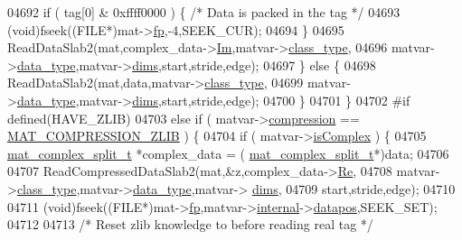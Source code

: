 \begin{DoxyCode}
{{{{{{{{{{{{{{{{{{{{{{{{{{04692                 \textcolor{keywordflow}{if} ( tag[0] & 0xffff0000 ) \{ \textcolor{comment}{/* Data is packed in the tag */}
04693                     (void)fseek((FILE*)mat->\hyperlink{struct__mat__t_a85f562e407ca9ad4d2a6e14f839432b7}{fp},-4,SEEK\_CUR);
04694                 \}
04695                 ReadDataSlab2(mat,complex\_data->\hyperlink{group___m_a_t_a7182d10b0d3598415887376065440946}{Im},matvar->\hyperlink{group___m_a_t_aff13035bf3265dd7d9425e5d40c839d4}{class\_type},
04696                               matvar->\hyperlink{group___m_a_t_ab6aafe9bd77f0f077852593dec438144}{data\_type},matvar->\hyperlink{group___m_a_t_a8e01234e1c862ce3472bb37f5a09b92c}{dims},start,stride,edge);
04697             \} \textcolor{keywordflow}{else} \{
04698                 ReadDataSlab2(mat,data,matvar->\hyperlink{group___m_a_t_aff13035bf3265dd7d9425e5d40c839d4}{class\_type},
04699                     matvar->\hyperlink{group___m_a_t_ab6aafe9bd77f0f077852593dec438144}{data\_type},matvar->\hyperlink{group___m_a_t_a8e01234e1c862ce3472bb37f5a09b92c}{dims},start,stride,edge);
04700             \}
04701         \}
04702 \textcolor{preprocessor}{#if defined(HAVE\_ZLIB)}
04703         \textcolor{keywordflow}{else} \textcolor{keywordflow}{if} ( matvar->\hyperlink{group___m_a_t_aeef0466048621cb2c959ba7f6c774d06}{compression} == \hyperlink{group___m_a_t_gga768c318af97bd2567758ecb001ceb7f4a5181d2f71eab0f12f05ba65d4f13fb53}{MAT\_COMPRESSION\_ZLIB} ) \{
04704             \textcolor{keywordflow}{if} ( matvar->\hyperlink{group___m_a_t_aeb03b3a69f108dc05470b00443a43739}{isComplex} ) \{
04705                 \hyperlink{group___m_a_t_structmat__complex__split__t}{mat\_complex\_split\_t} *complex\_data = (
      \hyperlink{group___m_a_t_structmat__complex__split__t}{mat\_complex\_split\_t}*)data;
04706 
04707                 ReadCompressedDataSlab2(mat,&z,complex\_data->\hyperlink{group___m_a_t_a484a93607508adac2bce53a0252e0325}{Re},
04708                     matvar->\hyperlink{group___m_a_t_aff13035bf3265dd7d9425e5d40c839d4}{class\_type},matvar->\hyperlink{group___m_a_t_ab6aafe9bd77f0f077852593dec438144}{data\_type},matvar->
      \hyperlink{group___m_a_t_a8e01234e1c862ce3472bb37f5a09b92c}{dims},
04709                     start,stride,edge);
04710 
04711                 (void)fseek((FILE*)mat->\hyperlink{struct__mat__t_a85f562e407ca9ad4d2a6e14f839432b7}{fp},matvar->\hyperlink{group___m_a_t_a6e97e3ed9f40c49322c18561c2a94e92}{internal}->\hyperlink{structmatvar__internal_afd3bfaab126a160bd6855563e1ea0a7e}{datapos},SEEK\_SET);
04712 
04713                 \textcolor{comment}{/* Reset zlib knowledge to before reading real tag */}
}}}}}}}}}}}}}}}}}}}}}}}}}}
\end{DoxyCode}
